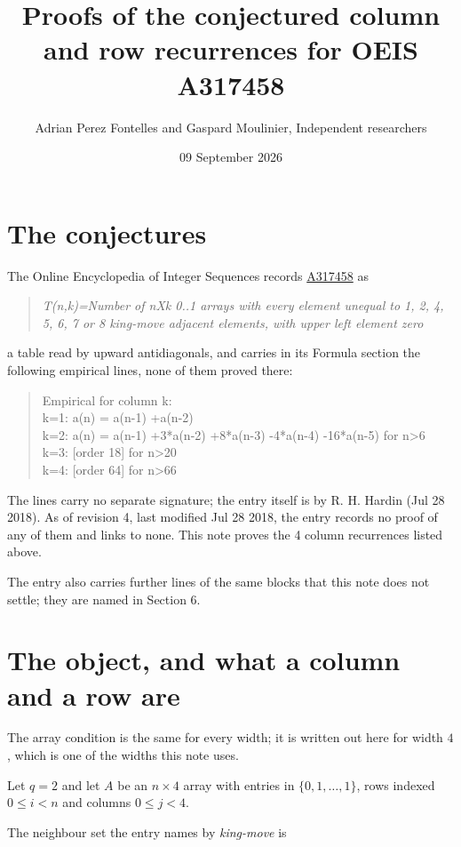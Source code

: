 \documentclass[11pt]{article}
\title{Proofs of the conjectured column and row recurrences for OEIS A317458}
\author{Adrian Perez Fontelles and Gaspard Moulinier, Independent researchers}
\date{09 September 2026}
\theoremstyle{definition}
\begin{document}
\maketitle
\section{The conjectures}

The Online Encyclopedia of Integer Sequences records \href{https://oeis.org/A317458}{A317458} as

\begin{quote}\itshape T(n,k)=Number of nXk 0..1 arrays with every element unequal to 1, 2, 4, 5, 6, 7 or 8 king-move adjacent elements, with upper left element zero\end{quote}

a table read by upward antidiagonals, and carries in its Formula section the following empirical lines, none of them proved there:

\begin{quote}\ttfamily Empirical for column k:\\
k=1: a(n) = a(n-1) +a(n-2)\\k=2: a(n) = a(n-1) +3*a(n-2) +8*a(n-3) -4*a(n-4) -16*a(n-5) for n>6\\k=3: [order 18] for n>20\\k=4: [order 64] for n>66\end{quote}

The lines carry no separate signature; the entry itself is by R. H. Hardin (Jul 28 2018). As of revision 4, last modified Jul 28 2018, the entry records no proof of any of them and links to none. This note proves the 4 column recurrences listed above.

The entry also carries further lines of the same blocks that this note does not settle; they are named in Section 6.

\section{The object, and what a column and a row are}

The array condition is the same for every width; it is written out here for width $4$, which is one of the widths this note uses.

Let $q = 2$ and let $A$ be an $n \times 4$ array with entries in $\{0,1,\dots,1\}$, rows indexed $0 \le i < n$ and columns $0 \le j < 4$.

The neighbour set the entry names by {\itshape king-move} is
\end{document}

